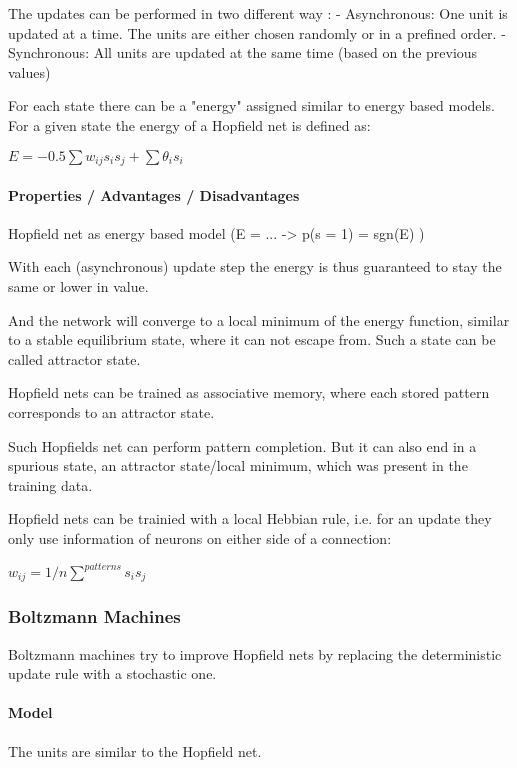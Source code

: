 The updates can be performed in two different way :
- Asynchronous: One unit is updated at a time. The units are either chosen randomly or in a prefined order.
- Synchronous: All units are updated at the same time (based on the previous values)

For each state there can be a "energy" assigned similar to energy based models. 
For a given state the energy of a Hopfield net is defined as:

$E = - 0.5 \sum w_{ij} s_i s_j + \sum \theta_i s_i$

\paragraph{Properties / Advantages / Disadvantages}

Hopfield net as energy based model (E = ... -> p(s = 1) = sgn(E) )

With each (asynchronous) update step the energy is thus guaranteed to stay the same or lower in value.

And the network will converge to a local minimum of the energy function, similar to a stable equilibrium state, where it can not escape from. 
Such a state can be called attractor state.

Hopfield nets can be trained as associative memory, where each stored pattern corresponds to an attractor state.

Such Hopfields net can perform pattern completion. But it can also end in a spurious state, an attractor state/local minimum, which was present in the training data.

Hopfield nets can be trainied with a local Hebbian rule, i.e. for an update they only use information of neurons on either side of a connection:

$w_{ij} = 1/n \sum^{patterns} s_{i} s_{j}$

\subsubsection{Boltzmann Machines}

Boltzmann machines try to improve Hopfield nets by replacing the deterministic update rule with a stochastic one.

\paragraph{Model}

The units are similar to the Hopfield net.

